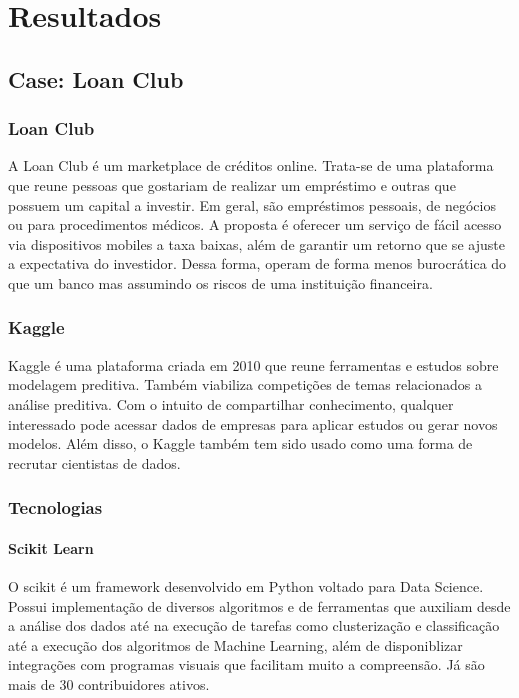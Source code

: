 \part{Resultados}

\chapter{Case: Loan Club}

\section{Loan Club}

A Loan Club é um marketplace de créditos online. Trata-se de uma plataforma que reune pessoas que gostariam de realizar um empréstimo e outras que possuem um capital a investir. Em geral, são empréstimos pessoais, de negócios ou para procedimentos médicos. A proposta é oferecer um serviço de fácil acesso via dispositivos mobiles a taxa baixas, além de garantir um retorno que se ajuste a expectativa do investidor. Dessa forma, operam de forma menos burocrática do que um banco mas assumindo os riscos de uma instituição financeira.

\section{Kaggle}

Kaggle é uma plataforma criada em 2010 que reune ferramentas e estudos sobre modelagem preditiva. Também viabiliza competições de temas relacionados a análise preditiva. Com o intuito de compartilhar conhecimento, qualquer interessado pode acessar dados de empresas para aplicar estudos ou gerar novos modelos. Além disso, o Kaggle também tem sido usado como uma forma de recrutar cientistas de dados. 

\section{Tecnologias}

\subsection{Scikit Learn}

O scikit é um framework desenvolvido em Python voltado para Data Science. Possui implementação de diversos algoritmos e de ferramentas que auxiliam desde a análise dos dados até na execução de tarefas como clusterização e classificação até a execução dos algoritmos de Machine Learning, além de disponiblizar integrações com programas visuais que facilitam muito a compreensão. Já são mais de 30 contribuidores ativos. 


